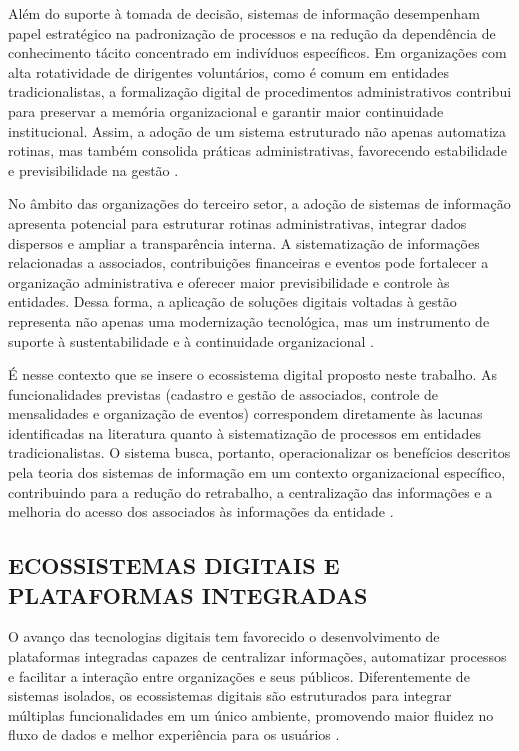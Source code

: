 ﻿\documentclass[12pt,a4paper]{article}
\begin{document}
Além do suporte à tomada de decisão, sistemas de informação desempenham papel estratégico na padronização de processos e na redução da dependência de conhecimento tácito concentrado em indivíduos específicos. Em organizações com alta rotatividade de dirigentes voluntários, como é comum em entidades tradicionalistas, a formalização digital de procedimentos administrativos contribui para preservar a memória organizacional e garantir maior continuidade institucional. Assim, a adoção de um sistema estruturado não apenas automatiza rotinas, mas também consolida práticas administrativas, favorecendo estabilidade e previsibilidade na gestão \citep{delone2003,vial2019}.

No âmbito das organizações do terceiro setor, a adoção de sistemas de informação apresenta potencial para estruturar rotinas administrativas, integrar dados dispersos e ampliar a transparência interna. A sistematização de informações relacionadas a associados, contribuições financeiras e eventos pode fortalecer a organização administrativa e oferecer maior previsibilidade e controle às entidades. Dessa forma, a aplicação de soluções digitais voltadas à gestão representa não apenas uma modernização tecnológica, mas um instrumento de suporte à sustentabilidade e à continuidade organizacional \citep{vial2019,verhoef2021}.

É nesse contexto que se insere o ecossistema digital proposto neste trabalho. As funcionalidades previstas (cadastro e gestão de associados, controle de mensalidades e organização de eventos) correspondem diretamente às lacunas identificadas na literatura quanto à sistematização de processos em entidades tradicionalistas. O sistema busca, portanto, operacionalizar os benefícios descritos pela teoria dos sistemas de informação em um contexto organizacional específico, contribuindo para a redução do retrabalho, a centralização das informações e a melhoria do acesso dos associados às informações da entidade \citep{laudon2014,delone2003}.

\subsection{ECOSSISTEMAS DIGITAIS E PLATAFORMAS INTEGRADAS}

O avanço das tecnologias digitais tem favorecido o desenvolvimento de plataformas integradas capazes de centralizar informações, automatizar processos e facilitar a interação entre organizações e seus públicos. Diferentemente de sistemas isolados, os ecossistemas digitais são estruturados para integrar múltiplas funcionalidades em um único ambiente, promovendo maior fluidez no fluxo de dados e melhor experiência para os usuários \citep{gawercusumano2014,jacobides2018}.
\end{document}
